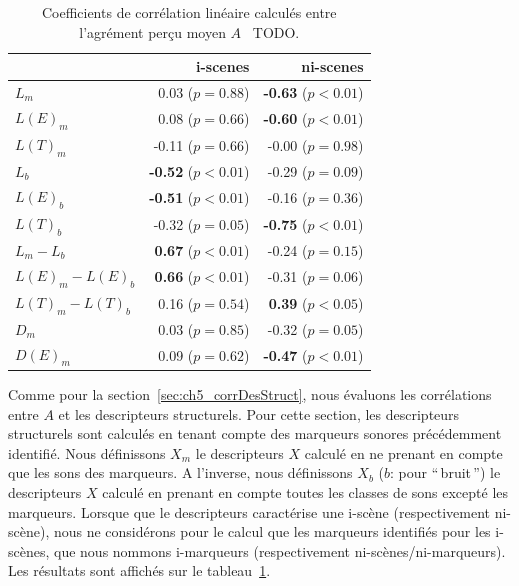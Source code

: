 \begin{table}[t]
\centering
\begin{tabular}{l r r} 
               &   i-scenes                   & ni-scenes \\
\hline
$L_m$            & 0.03  ($p=0.88$)           & \textbf{-0.63} ($p<0.01$) \\
$L(E)_m$           & 0.08  ($p=0.66$)           & \textbf{-0.60} ($p<0.01$) \\
$L(T)_m$           & -0.11 ($p=0.66$)           & -0.00 ($p=0.98$) \\
$L_b$            & \textbf{-0.52} ($p<0.01$)  & -0.29 ($p=0.09$) \\
$L(E)_b$           & \textbf{-0.51} ($p<0.01$)  & -0.16 ($p=0.36$) \\
$L(T)_b$           & -0.32 ($p=0.05$)           & \textbf{-0.75} ($p<0.01$) \\
$L_m-L_b$        & \textbf{0.67} ($p<0.01$)   & -0.24 ($p=0.15$) \\
$L(E)_m-L(E)_b$      & \textbf{0.66} ($p<0.01$)   & -0.31 ($p=0.06$) \\
$L(T)_m-L(T)_b$      & 0.16 ($p=0.54$)            & \textbf{0.39} ($p<0.05$) \\
$D_m$            & 0.03 ($p=0.85$)            & -0.32 ($p=0.05$) \\
$D(E)_m$           & 0.09  ($p=0.62$)           & \textbf{-0.47} ($p<0.01$) \\
\hline
\end{tabular}
\vspace{0.5mm}
\caption{Coefficients de corrélation linéaire calculés entre l'agrément perçu moyen $A$ \vs~TODO.}
\label{tab:corrMarkers}
\end{table}

Comme pour la  section~\ref{sec:ch5_corrDesStruct}, nous évaluons les corrélations entre $A$ et les descripteurs structurels. Pour cette section, les descripteurs structurels sont calculés en tenant compte des marqueurs sonores précédemment identifié. Nous définissons $X_m$ le descripteurs $X$ calculé en ne prenant en compte que les sons des marqueurs. A l'inverse, nous définissons $X_b$ ($b$: pour ``\,bruit\,'') le descripteurs $X$ calculé en prenant en compte toutes les classes de sons excepté les marqueurs. Lorsque que le descripteurs caractérise une i-scène (respectivement ni-scène), nous ne considérons pour le calcul que les marqueurs identifiés pour les i-scènes, que nous nommons i-marqueurs (respectivement ni-scènes/ni-marqueurs). Les résultats sont affichés sur le tableau~\ref{tab:corrMarkers}.

